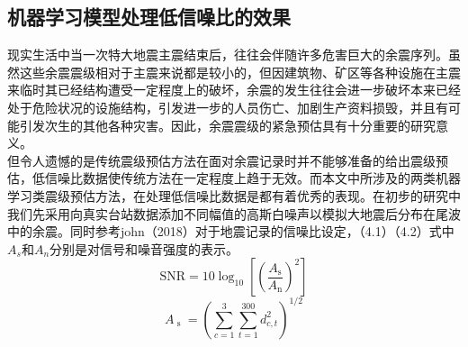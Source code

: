 \subsection{机器学习模型处理低信噪比的效果}
\indent 现实生活中当一次特大地震主震结束后，往往会伴随许多危害巨大的余震序列。虽然这些余震震级相对于主震来说都是较小的，但因建筑物、矿区等各种设施在主震来临时其已经结构遭受一定程度上的破坏，余震的发生往往会进一步破坏本来已经处于危险状况的设施结构，引发进一步的人员伤亡、加剧生产资料损毁，并且有可能引发次生的其他各种灾害。因此，余震震级的紧急预估具有十分重要的研究意义。\\
\indent 但令人遗憾的是传统震级预估方法在面对余震记录时并不能够准备的给出震级预估，低信噪比数据使传统方法在一定程度上趋于无效。而本文中所涉及的两类机器学习类震级预估方法，在处理低信噪比数据是都有着优秀的表现。在初步的研究中我们先采用向真实台站数据添加不同幅值的高斯白噪声以模拟大地震后分布在尾波中的余震。同时参考john（2018）对于地震记录的信噪比设定，（4.1）（4.2）式中$A_{s}$和$A_{n}$分别是对信号和噪音强度的表示。
\begin{equation}
\mathrm{SNR}=10 \log _{10}\left[\left(\frac{A_{\text {s}}}{A_{\text {n}}}\right)^{2}\right]
\end{equation}
\begin{equation}
A_{\text { s }}=\left(\sum_{c=1}^{3} \sum_{t=1}^{300} d_{c, t}^{2}\right)^{1 / 2}
\end{equation}